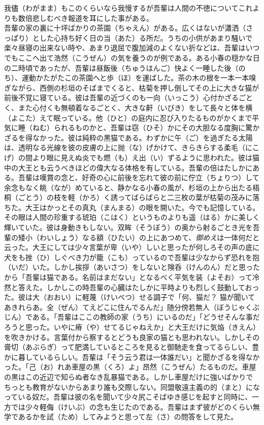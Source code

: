 \documentclass{book}
\begin{document}
我儘（わがまま）もこのくらいなら我慢するが吾輩は人間の不徳についてこれよりも数倍悲しむべき報道を耳にした事がある。\\
吾輩の家の裏に十坪ばかりの茶園（ちゃえん）がある。広くはないが瀟洒（さっぱり）とした心持ち好く日の当（あた）る所だ。うちの小供があまり騒いで楽々昼寝の出来ない時や、あまり退屈で腹加減のよくない折などは、吾輩はいつでもここへ出て浩然（こうぜん）の気を養うのが例である。ある小春の穏かな日の二時頃であったが、吾輩は昼飯後（ちゅうはんご）快よく一睡した後（のち）、運動かたがたこの茶園へと歩（ほ）を運ばした。茶の木の根を一本一本嗅ぎながら、西側の杉垣のそばまでくると、枯菊を押し倒してその上に大きな猫が前後不覚に寝ている。彼は吾輩の近づくのも一向（いっこう）心付かざるごとく、また心付くも無頓着なるごとく、大きな鼾（いびき）をして長々と体を横（よこた）えて眠っている。他（ひと）の庭内に忍び入りたるものがかくまで平気に睡（ねむ）られるものかと、吾輩は窃（ひそ）かにその大胆なる度胸に驚かざるを得なかった。彼は純粋の黒猫である。わずかに午（ご）を過ぎたる太陽は、透明なる光線を彼の皮膚の上に抛（な）げかけて、きらきらする柔毛（にこげ）の間より眼に見えぬ炎でも燃（も）え出（い）ずるように思われた。彼は猫中の大王とも云うべきほどの偉大なる体格を有している。吾輩の倍はたしかにある。吾輩は嘆賞の念と、好奇の心に前後を忘れて彼の前に佇立（ちょりつ）して余念もなく眺（なが）めていると、静かなる小春の風が、杉垣の上から出たる梧桐（ごとう）の枝を軽（かろ）く誘ってばらばらと二三枚の葉が枯菊の茂みに落ちた。大王はかっとその真丸（まんまる）の眼を開いた。今でも記憶している。その眼は人間の珍重する琥珀（こはく）というものよりも遥（はる）かに美しく輝いていた。彼は身動きもしない。双眸（そうぼう）の奥から射るごとき光を吾輩の矮小（わいしょう）なる額（ひたい）の上にあつめて、\emph{御めえ}は一体何だと云った。大王にしては少々言葉が卑（いや）しいと思ったが何しろその声の底に犬をも挫（ひ）しぐべき力が籠（こも）っているので吾輩は少なからず恐れを抱（いだ）いた。しかし挨拶（あいさつ）をしないと険呑（けんのん）だと思ったから「吾輩は猫である。名前はまだない」となるべく平気を装（よそお）って冷然と答えた。しかしこの時吾輩の心臓はたしかに平時よりも烈しく鼓動しておった。彼は大（おおい）に軽蔑（けいべつ）せる調子で「何、猫だ？ 猫が聞いてあきれらあ。全（ぜん）てえどこに住んでるんだ」随分傍若無人（ぼうじゃくぶじん）である。「吾輩はここの教師の家（うち）にいるのだ」「どうせそんな事だろうと思った。いやに瘠（や）せてるじゃねえか」と大王だけに気焔（きえん）を吹きかける。言葉付から察するとどうも良家の猫とも思われない。しかしその膏切（あぶらぎ）って肥満しているところを見ると御馳走を食ってるらしい、豊かに暮しているらしい。吾輩は「そう云う君は一体誰だい」と聞かざるを得なかった。「己（お）れあ車屋の黒（くろ）よ」昂然（こうぜん）たるものだ。車屋の黒はこの近辺で知らぬ者なき乱暴猫である。しかし車屋だけに強いばかりでちっとも教育がないからあまり誰も交際しない。同盟敬遠主義の的（まと）になっている奴だ。吾輩は彼の名を聞いて少々尻こそばゆき感じを起すと同時に、一方では少々軽侮（けいぶ）の念も生じたのである。吾輩はまず彼がどのくらい無学であるかを試（ため）してみようと思って左（さ）の問答をして見た。\\
\end{document}
